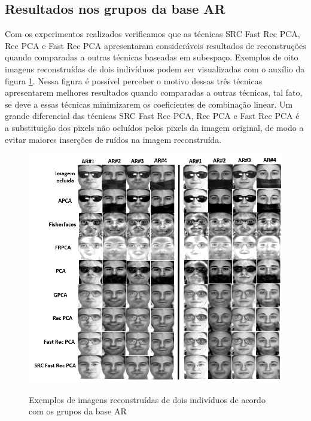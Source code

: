 \subsection{Resultados nos grupos da base AR}

Com os experimentos realizados verificamos que as técnicas SRC Fast Rec PCA, Rec PCA e Fast Rec PCA apresentaram consideráveis resultados de reconstruções quando comparadas a outras técnicas baseadas em subespaço. Exemplos de oito imagens reconstruídas de dois indivíduos podem ser visualizadas com o auxílio da figura \ref{fig:exemplos_reconstrucoes}. Nessa figura é possível perceber o motivo dessas três técnicas apresentarem melhores resultados quando comparadas a outras técnicas, tal fato, se deve a essas técnicas minimizarem os coeficientes de combinação linear. Um grande diferencial das técnicas SRC Fast Rec PCA, Rec PCA e Fast Rec PCA é a substituição dos pixels não ocluídos pelos pixels da imagem original, de modo a evitar maiores inserções de ruídos na imagem reconstruída.

\begin{figure}[H]
\centering
\caption{Exemplos de imagens reconstruídas de dois indivíduos de acordo com os grupos da base AR}
\includegraphics[scale=0.68]{imgs4/reconstrucoes_subespaco}
\label{fig:exemplos_reconstrucoes}
\end{figure}




